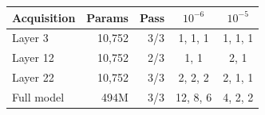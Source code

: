 \begin{tabular}{lrrcc}
\toprule
Acquisition & Params & Pass & $10^{-6}$ & $10^{-5}$ \\
\midrule
Layer 3 & 10,752 & 3/3 & 1, 1, 1 & 1, 1, 1 \\
Layer 12 & 10,752 & 2/3 & 1, 1 & 2, 1 \\
Layer 22 & 10,752 & 3/3 & 2, 2, 2 & 2, 1, 1 \\
Full model & 494M & 3/3 & 12, 8, 6 & 4, 2, 2 \\
\bottomrule
\end{tabular}
